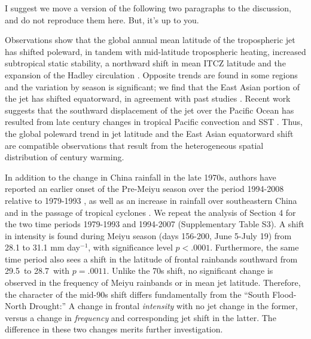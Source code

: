 \documentclass[draft,grl]{AGUTeX}
\begin{document}
\begin{article}
{ \color{red} I suggest we move a version of the following two paragraphs to the discussion, and do not reproduce them here. But, it's up to you. }	

	 Observations show that the global annual mean latitude of the tropospheric jet has shifted poleward, in tandem with mid-latitude tropospheric heating, increased subtropical static stability, a northward shift in mean ITCZ latitude and the expansion of the Hadley circulation \citep{Fu2006,Archer2008, Fu2011}. {\color{blue}  Opposite trends are found in some regions and the variation by season is significant;  we find that the East Asian portion of the jet has shifted equatorward, in agreement with past studies \citep{Yu2007, Archer2008}.} Recent work suggests that the southward displacement of the jet over the Pacific Ocean has resulted from late  century changes in tropical Pacific convection and SST \citep{Park2014a}. Thus, the global poleward trend in jet latitude and the East Asian equatorward shift are compatible observations that result from the heterogeneous spatial distribution of  century warming.
	 
	 In addition to the change in China rainfall in the late 1970s, authors have reported an earlier onset of the Pre-Meiyu season over the period 1994-2008 relative to 1979-1993 \citep{Kajikawa2012}, as well as an increase in rainfall over southeastern China and in the passage of tropical cyclones \citep{Kwon2007,Chang2014}. We repeat the analysis of Section 4 for the two time periods 1979-1993 and 1994-2007 (Supplementary Table S3). A shift in intensity is found during Meiyu season (days 156-200, June 5-July 19) from 28.1 to 31.1 mm day$^{-1}$, with significance level $p<.0001$. Furthermore, the same time period also sees a shift in the latitude of frontal rainbands southward from 29.5\textdegree\ to 28.7\textdegree\ with $p=.0011$. Unlike the 70s shift, no significant change is observed in the frequency of Meiyu rainbands or in mean jet latitude. Therefore, the character of the mid-90s shift differs fundamentally from the ``South Flood-North Drought:'' A change in frontal \textit{intensity} with no jet change in the former, versus a change in \textit{frequency} and corresponding jet shift in the latter. The difference in these two changes merits further investigation.


\end{article}
\end{document}
